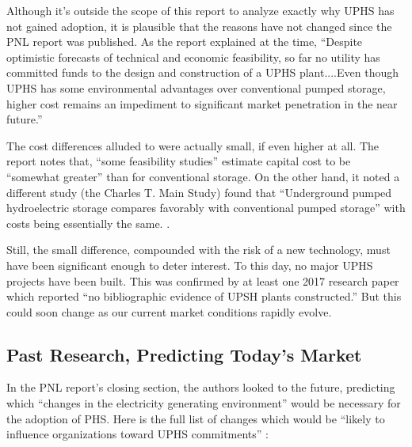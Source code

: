 \documentclass[hidelinks,12pt,a4paper]{article}
\begin{document}
Although it's outside the scope of this report to analyze exactly why UPHS has not gained adoption, it is plausible that the reasons have not changed since the PNL report was published. As the report explained at the time, “Despite optimistic forecasts of technical and economic feasibility, so far no utility has committed funds to the design and construction of a UPHS plant....Even though UPHS has some environmental advantages over conventional pumped storage, higher cost remains an impediment to significant market penetration in the near future.” \cite{SubSurfacePumpedHydroelectricStorage}

The cost differences alluded to were actually small, if even higher at all. The report notes that, “some feasibility studies” estimate capital cost to be “somewhat greater” than for conventional storage. \cite{SubSurfacePumpedHydroelectricStorage} On the other hand, it noted a different study (the Charles T. Main Study) found that “Underground pumped hydroelectric storage compares favorably with conventional pumped storage” with costs being essentially the same. \cite{SubSurfacePumpedHydroelectricStorage}.


Still, the small difference, compounded with the risk of a new technology, must have been significant enough to deter interest. To this day, no major UPHS projects have been built. This was confirmed by at least one 2017 research paper which reported “no bibliographic evidence of UPSH plants constructed.” \cite{UndergroundPumpedStorageHydropowerPlantsUsingOpenPitMines}
But this could soon change as our current market conditions rapidly evolve.

\subsection{Past Research, Predicting Today's Market}
In the PNL report's closing section, the authors looked to the future, predicting which “changes in the electricity generating environment” would be necessary for the adoption of PHS. Here is the full list of changes which would be “likely to influence organizations toward UPHS commitments” \cite{SubSurfacePumpedHydroelectricStorage}:
\end{document}

